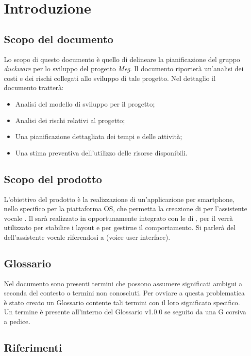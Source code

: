 \clearpage
\section{Introduzione}
\subsection{Scopo del documento}
Lo scopo di questo documento è quello di delineare la pianificazione del gruppo \emph{duckware} per lo sviluppo del progetto \emph{Meg}. Il documento riporterà un'analisi dei costi e dei rischi collegati allo sviluppo di tale progetto. Nel dettaglio il documento tratterà:
\begin{itemize}
	\item Analisi del modello di sviluppo per il progetto;
	\item Analisi dei rischi relativi al progetto;
	\item Una pianificazione dettagliata dei tempi e delle attività;
	\item Una stima preventiva dell'utilizzo delle risorse disponibili.
\end{itemize}
\subsection{Scopo del prodotto}
L'obiettivo del prodotto è la realizzazione di un'applicazione per smartphone, nello specifico per la piattaforma  OS, che permetta la creazione di  per l'assistente vocale  . Il  sarà realizzato in  opportunamente integrato con le  di , per il  verrà utilizzato  per stabilire i layout e  per gestirne il comportamento. Si parlerà del  dell'assistente vocale riferendosi a (voice user interface).
\subsection{Glossario}
Nel documento sono presenti termini che possono assumere significati ambigui a seconda del contesto o termini non conosciuti. Per ovviare a questa problematica è stato creato un Glossario contente tali termini con il loro significato specifico. Un termine è presente all'interno del Glossario v1.0.0 se seguito da una G corsiva a pedice.
\subsection{Riferimenti}
